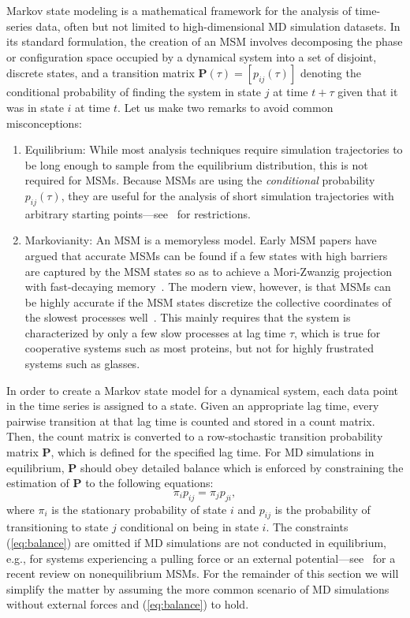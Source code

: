 \documentclass[9pt,tutorial]{livecoms}
\begin{document}
Markov state modeling is a mathematical framework for the analysis of time-series data, often but not limited to high-dimensional MD simulation datasets.
In its standard formulation, the creation of an MSM involves decomposing the phase or configuration space occupied by a dynamical system into a set of disjoint, discrete states,
and a transition matrix $\mathbf{P}(\tau) = [p_{ij}(\tau)]$ denoting the conditional probability of finding the system in state $j$ at time $t+\tau$ given that it was in state $i$ at time $t$.
Let us make two remarks to avoid common misconceptions:
\begin{enumerate}
\item Equilibrium:
While most analysis techniques require simulation trajectories to be long enough to sample from the equilibrium distribution, this is not required for MSMs.
Because MSMs are using the \emph{conditional} probability $p_{ij}(\tau)$,
they are useful for the analysis of short simulation trajectories with arbitrary starting points---see~\cite{oom-feliks} for restrictions.
\item Markovianity:
An MSM is a memoryless model.
Early MSM papers have argued that accurate MSMs can be found if a few states with high barriers are captured by the MSM states so as to achieve a Mori-Zwanzig projection with fast-decaying memory~\cite{swope-its,noe2007jcp,chodera2007jcp}.
The modern view, however, is that MSMs can be highly accurate if the MSM states discretize the collective coordinates of the slowest processes well~\cite{msm-jhp}.
This mainly requires that the system is characterized by only a few slow processes at lag time $\tau$,
which is true for cooperative systems such as most proteins, but not for highly frustrated systems such as glasses.
\end{enumerate}

In order to create a Markov state model for a dynamical system, each data point in the time series is assigned to a state.
Given an appropriate lag time, every pairwise transition at that lag time is counted and stored in a count matrix.
Then, the count matrix is converted to a row-stochastic transition probability matrix $\mathbf{P}$, which is defined for the specified lag time.
For MD simulations in equilibrium, $\mathbf{P}$ should obey detailed balance which is enforced by constraining the estimation of $\mathbf{P}$ to the following equations:
\begin{equation}
\label{eq:balance}
\pi_i p_{ij} = \pi_j p_{ji},
\end{equation}
where $\pi_i$ is the stationary probability of state $i$ and $p_{ij}$ is the probability of transitioning to state $j$ conditional on being in state $i$.
The constraints (\ref{eq:balance}) are omitted if MD simulations are not conducted in equilibrium, e.g.,
for systems experiencing a pulling force or an external potential---see~\cite{Koltai2018} for a recent review on nonequilibrium MSMs.
For the remainder of this section we will simplify the matter by assuming the more common scenario of MD simulations without external forces and (\ref{eq:balance}) to hold.
\end{document}
